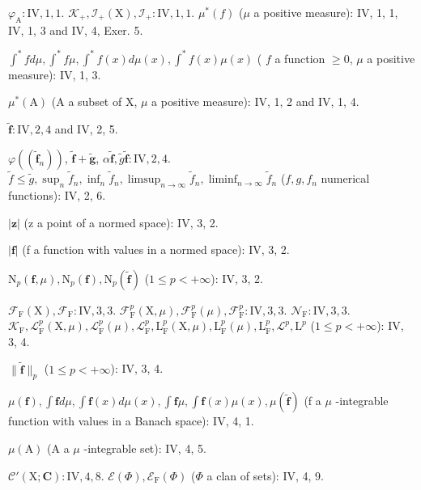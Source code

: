 \(\varphi_{\mathrm{A}}:\mathrm{IV},1,1.\) \(\mathcal{K}_{+},\mathcal{I}_{+}(\mathrm{X}),\mathcal{I}_{+}:\mathrm{IV},1,1.\) \(\mu^{*}(f)\) (\(\mu\) a positive measure): IV, 1, 1, IV, 1, 3 and IV, 4, Exer. 5.

\(\int^{*}fd\mu,\int^{*}f\mu,\int^{*}f(x)d\mu(x),\int^{*}f(x)\mu(x)\) ( \(f\) a function \(\geqslant 0\), \(\mu\) a positive measure): IV, 1, 3.

\(\mu^{*}(\mathrm{A})\) (A a subset of X, \(\mu\) a positive measure): IV, 1, 2 and IV, 1, 4.

\(\widetilde{\mathbf{f}}:\mathrm{IV},2,4\) and IV, 2, 5.

\(\varphi((\widetilde{\mathbf{f}}_n))\), \(\widetilde{\mathbf{f}} +\widetilde{\mathbf{g}}\), \(\alpha \widetilde{\mathbf{f}},\widetilde{g}\widetilde{\mathbf{f}}:\mathrm{IV},2,4.\) \(\widetilde{f}\leqslant \widetilde{g},\sup_{n}\widetilde{f}_n,\inf_n\widetilde{f}_n,\limsup_{n\to \infty}\widetilde{f}_n,\liminf_{n\to \infty}\widetilde{f}_n\) (\(f,g,f_n\) numerical functions): IV, 2, 6.

\(|\mathbf{z}|\) (z a point of a normed space): IV, 3, 2.

\(|\mathbf{f}|\) (f a function with values in a normed space): IV, 3, 2.

\(\mathrm{N}_p(\mathbf{f},\mu),\mathrm{N}_p(\mathbf{f}),\mathrm{N}_p(\widetilde{\mathbf{f}})\) (\(1\leqslant p<+\infty\)): IV, 3, 2.

\(\mathcal{F}_{\mathrm{F}}(\mathrm{X}),\mathcal{F}_{\mathrm{F}}:\mathrm{IV},3,3.\) \(\mathcal{F}_{\mathrm{F}}^{p}(\mathrm{X},\mu),\mathcal{F}_{\mathrm{F}}^{p}(\mu),\mathcal{F}_{\mathrm{F}}^{p}:\mathrm{IV},3,3.\) \(\mathcal{N}_{\mathrm{F}}:\mathrm{IV},3,3.\) \(\mathcal{K}_{\mathrm{F}},\mathcal{L}_{\mathrm{F}}^{p}(\mathrm{X},\mu),\mathcal{L}_{\mathrm{F}}^{p}(\mu),\mathcal{L}_{\mathrm{F}}^{p},\mathrm{L}_{\mathrm{F}}^{p}(\mathrm{X},\mu),\mathrm{L}_{\mathrm{F}}^{p}(\mu),\mathrm{L}_{\mathrm{F}}^{p},\mathcal{L}^{p},\mathrm{L}^{p}\) (\(1\leqslant p<+\infty\)): IV, 3, 4.

\(\| \widetilde{\mathbf{f}} \| _p\) (\(1\leqslant p < + \infty\)): IV, 3, 4.

\(\mu (\mathbf{f}),\int \mathbf{f}d\mu ,\int \mathbf{f}(x)d\mu (x),\int \mathbf{f}\mu ,\int \mathbf{f}(x)\mu (x),\mu (\widetilde{\mathbf{f}})\) (f a \(\mu\) -integrable function with values in a Banach space): IV, 4, 1.

\(\mu (\mathrm{A})\) (A a \(\mu\) -integrable set): IV, 4, 5.

\(\mathcal{C}'(\mathrm{X};\mathbf{C}):\mathrm{IV},4,8.\) \(\mathcal{E}(\Phi),\mathcal{E}_{\mathrm{F}}(\Phi)\) (\(\Phi\) a clan of sets): IV, 4, 9.

